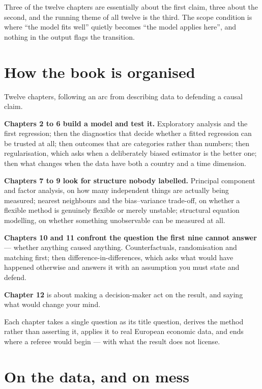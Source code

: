 \documentclass[
  letterpaper,
  10pt,
  twoside,
  openright,
  numbers=noenddot,
  chapterprefix=true]{scrbook}
\begin{document}
Three of the twelve chapters are essentially about the first claim,
three about the second, and the running theme of all twelve is the
third. The scope condition is where ``the model fits well'' quietly
becomes ``the model applies here'', and nothing in the output flags the
transition.

\section{How the book is organised}\label{how-the-book-is-organised}

Twelve chapters, following an arc from describing data to defending a
causal claim.

\textbf{Chapters 2 to 6 build a model and test it.} Exploratory analysis
and the first regression; then the diagnostics that decide whether a
fitted regression can be trusted at all; then outcomes that are
categories rather than numbers; then regularisation, which asks when a
deliberately biased estimator is the better one; then what changes when
the data have both a country and a time dimension.

\textbf{Chapters 7 to 9 look for structure nobody labelled.} Principal
component and factor analysis, on how many independent things are
actually being measured; nearest neighbours and the bias--variance
trade-off, on whether a flexible method is genuinely flexible or merely
unstable; structural equation modelling, on whether something
unobservable can be measured at all.

\textbf{Chapters 10 and 11 confront the question the first nine cannot
answer} --- whether anything caused anything. Counterfactuals,
randomisation and matching first; then difference-in-differences, which
asks what would have happened otherwise and answers it with an
assumption you must state and defend.

\textbf{Chapter 12} is about making a decision-maker act on the result,
and saying what would change your mind.

Each chapter takes a single question as its title question, derives the
method rather than asserting it, applies it to real European economic
data, and ends where a referee would begin --- with what the result does
not license.

\section{On the data, and on mess}\label{on-the-data-and-on-mess}
\end{document}
